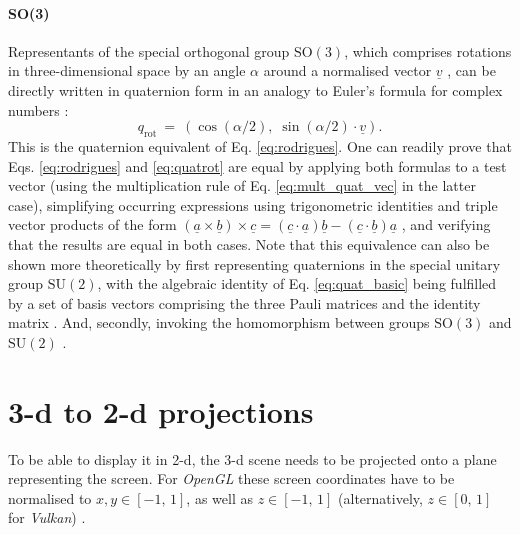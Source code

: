\paragraph{SO(3)}
Representants of the special orthogonal group $\mathrm{SO\left(3\right)}$, which comprises rotations in 
three-dimensional space by an angle $\alpha$ around a normalised vector $\underline{v}$ \cite[pp. 849-851]{Arfken2013},
can be directly written in quaternion form in an analogy to Euler's formula for complex numbers \cite{wiki_quatrot}:
\begin{equation}
	\boxed{
	q_{\mathrm{rot}} \ =\ \left(\cos\left(\alpha/2 \right),\; \sin\left(\alpha/2 \right) \cdot \underline{v} \right).
	}
	\label{eq:quatrot}
\end{equation}
This is the quaternion equivalent of Eq. \ref{eq:rodrigues}. One can readily prove that Eqs. \ref{eq:rodrigues} and \ref{eq:quatrot} are equal by applying both formulas to a test vector (using the multiplication rule of Eq.
\ref{eq:mult_quat_vec} in the  latter case), simplifying occurring expressions using trigonometric 
identities \cite{wiki_trig} and triple vector products of the form 
$\left(\underline{a} \times \underline{b}\right) \times \underline{c} = 
	\left( \underline{c}\cdot \underline{a} \right) \underline{b} - 
	\left( \underline{c}\cdot \underline{b} \right) \underline{a}$ \cite{wiki_tripleprod},
and verifying that the results are equal in both cases.
Note that this equivalence can also be shown more theoretically by first representing quaternions in the 
special unitary group $\mathrm{SU\left(2\right)}$, with the algebraic identity of 
Eq. \ref{eq:quat_basic} being fulfilled by a set of basis vectors comprising the three Pauli matrices and the 
identity matrix \cite[p. 116]{Arfken2013}. And, secondly, invoking the homomorphism 
between groups $\mathrm{SO\left(3\right)}$ and $\mathrm{SU\left(2\right)}$ \cite[pp. 851-852]{Arfken2013}.


\section{3-d to 2-d projections}
\label{sec:gl_projs}
To be able to display it in 2-d, the 3-d scene needs to be projected onto a plane representing the screen.
For \textit{OpenGL} these screen coordinates have to be normalised to $x, y \in \left[-1,\, 1\right]$,
as well as $z \in \left[-1,\, 1\right]$ (alternatively, $z \in \left[0,\, 1\right]$ for \textit{Vulkan}) 
\cite{web_QVulkanWindow}.

